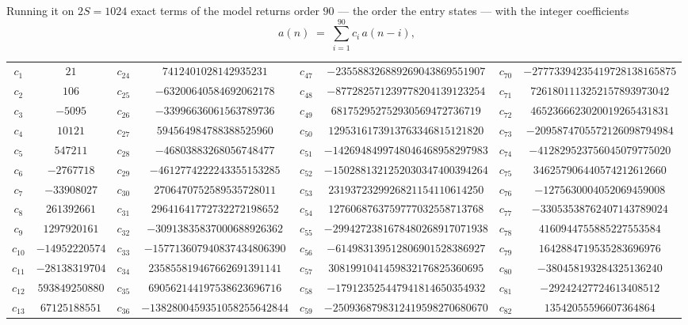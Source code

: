 \documentclass[11pt,a4paper]{article}
\theoremstyle{plain}
\theoremstyle{definition}
\begin{document}
Running it on $2S=1024$ exact terms of the model returns order $90$ --- the order the
entry states --- with the integer coefficients
\[
a(n)\;=\;\sum_{i=1}^{90}c_i\,a(n-i),
\]
\begin{center}\small
\begin{tabular}{cccccccc}
$c_{1}$ & $21$ & $c_{24}$ & $7412401028142935231$ & $c_{47}$ & $-235588326889269043869551907$ & $c_{70}$ & $-27773394235419728138165875$ \\
$c_{2}$ & $106$ & $c_{25}$ & $-63200640584692062178$ & $c_{48}$ & $-877282571239778204139123254$ & $c_{71}$ & $7261801113252157893973042$ \\
$c_{3}$ & $-5095$ & $c_{26}$ & $-33996636061563789736$ & $c_{49}$ & $681752952752930569472736719$ & $c_{72}$ & $4652366623020019265431831$ \\
$c_{4}$ & $10121$ & $c_{27}$ & $594564984788388525960$ & $c_{50}$ & $1295316173913763346815121820$ & $c_{73}$ & $-2095874705572126098794984$ \\
$c_{5}$ & $547211$ & $c_{28}$ & $-46803883268056748477$ & $c_{51}$ & $-1426948499748046468958297983$ & $c_{74}$ & $-412829523756045079775020$ \\
$c_{6}$ & $-2767718$ & $c_{29}$ & $-4612774222243355153285$ & $c_{52}$ & $-1502881321252030347400394264$ & $c_{75}$ & $346257906440574212612660$ \\
$c_{7}$ & $-33908027$ & $c_{30}$ & $2706470752589535728011$ & $c_{53}$ & $2319372329926821154110614250$ & $c_{76}$ & $-1275630004052069459008$ \\
$c_{8}$ & $261392661$ & $c_{31}$ & $29641641772732272198652$ & $c_{54}$ & $1276068763759777032558713768$ & $c_{77}$ & $-33053538762407143789024$ \\
$c_{9}$ & $1297920161$ & $c_{32}$ & $-30913835837000688926362$ & $c_{55}$ & $-2994272381678480268917071938$ & $c_{78}$ & $4160944755885227553584$ \\
$c_{10}$ & $-14952220574$ & $c_{33}$ & $-157713607940837434806390$ & $c_{56}$ & $-614983139512806901528386927$ & $c_{79}$ & $1642884719535283696976$ \\
$c_{11}$ & $-28138319704$ & $c_{34}$ & $235855819467662691391141$ & $c_{57}$ & $3081991041459832176825360695$ & $c_{80}$ & $-380458193284325136240$ \\
$c_{12}$ & $593849250880$ & $c_{35}$ & $690562144197538623696716$ & $c_{58}$ & $-179123525447941814650354932$ & $c_{81}$ & $-29242427724613408512$ \\
$c_{13}$ & $67125188551$ & $c_{36}$ & $-1382800459351058255642844$ & $c_{59}$ & $-2509368798312419598270680670$ & $c_{82}$ & $13542055596607364864$ \\

\end{tabular}
\end{center}
\end{document}
